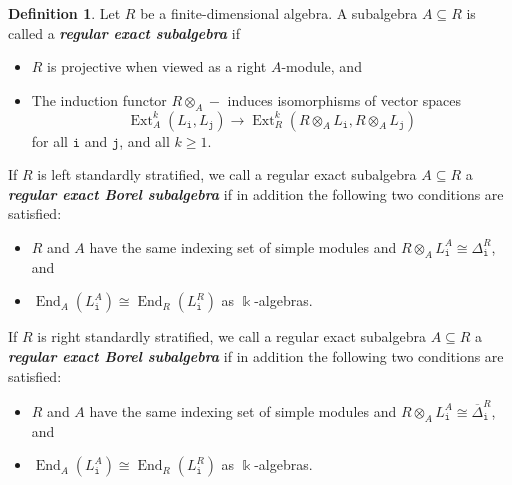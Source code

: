 \documentclass[12pt,a4paper]{amsart}
\theoremstyle{plain}
\theoremstyle{definition}
\newtheorem{defn}[thm]{Definition}
\numberwithin{equation}{thm}
\newcommand{\emphbf}[1]{\emph{\textbf{#1}}}
\DeclareMathOperator{\Ext}{Ext}
\DeclareMathOperator{\End}{End}
\begin{document}
\begin{defn}\label{definition-regular-exact}
Let $R$ be a finite-dimensional algebra. A subalgebra $A\subseteq R$ is called a \emphbf{regular exact subalgebra} if
\begin{itemize}
\item $R$ is projective when viewed as a right $A$-module, and 
\item The induction functor $R\otimes_A -$ induces isomorphisms of vector spaces
\begin{equation}
\label{eq:regularity}\Ext^k_A(L_\mathtt{i}, L_\mathtt{j})\to \Ext^k_R(R\otimes_A L_\mathtt{i}, R\otimes_A L_\mathtt{j})
\end{equation}
for all $\mathtt{i}$ and $\mathtt{j}$, and all $k\geq 1$. 
\end{itemize}
If $R$ is left standardly stratified, we call a regular exact subalgebra $A\subseteq R$ a \emphbf{regular exact Borel subalgebra} if in addition the following two conditions are satisfied:
\begin{itemize}
\item $R$ and $A$ have the same indexing set of simple modules and $R\otimes_A L_\mathtt{i}^A\cong \Delta_\mathtt{i}^R$, and
\item $\End_A(L_\mathtt{i}^A)\cong \End_R(L_\mathtt{i}^R)$ as $\Bbbk$-algebras. 
\end{itemize}
If $R$ is right standardly stratified, we call a regular exact subalgebra $A\subseteq R$ a \emphbf{regular exact Borel subalgebra} if in addition the following two conditions are satisfied:
\begin{itemize}
\item $R$ and $A$ have the same indexing set of simple modules and $R\otimes_A L_\mathtt{i}^A\cong \overline{\Delta}_\mathtt{i}^R$, and 
\item $\End_A(L_\mathtt{i}^A)\cong \End_R(L_\mathtt{i}^R)$ as $\Bbbk$-algebras.
\end{itemize}
\end{defn}
\end{document}
